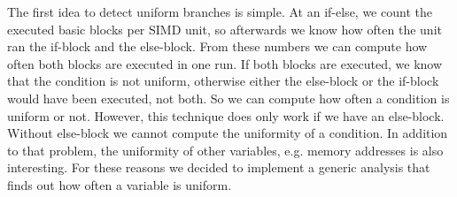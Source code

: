The first idea to detect uniform branches is simple. At an if-else, we count the executed basic blocks per SIMD unit, so afterwards we know how often the unit ran the if-block and the else-block. From these numbers we can compute how often both blocks are executed in one run.
If both blocks are executed, we know that the condition is not uniform, otherwise either the else-block or the if-block would have been executed, not both. So we can compute how often a condition is uniform or not.
However, this technique does only work if we have an else-block. Without else-block we cannot compute the uniformity of a condition. In addition to that problem, the uniformity of other variables, e.g. memory addresses is also interesting.
For these reasons we decided to implement a generic analysis that finds out how often a variable is uniform.
